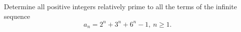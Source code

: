 Determine all positive integers relatively prime to all the terms of the infinite sequence \[ a_n=2^n+3^n+6^n -1,\ n\geq 1. \]
